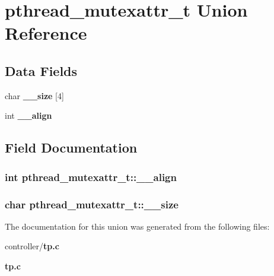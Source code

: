 \section{pthread\_\-mutexattr\_\-t Union Reference}
\label{unionpthread__mutexattr__t}
\subsection*{Data Fields}
\begin{DoxyCompactItemize}
\item 
char {\bf \_\-\_\-size} [4]
\item 
int {\bf \_\-\_\-align}
\end{DoxyCompactItemize}


\subsection{Field Documentation}
\subsubsection[{\_\-\_\-align}]{\setlength{\rightskip}{0pt plus 5cm}int {\bf pthread\_\-mutexattr\_\-t::\_\-\_\-align}}\label{unionpthread__mutexattr__t_acd638babf3a7cd2d4d576938de9fe8e8}
\subsubsection[{\_\-\_\-size}]{\setlength{\rightskip}{0pt plus 5cm}char {\bf pthread\_\-mutexattr\_\-t::\_\-\_\-size}}\label{unionpthread__mutexattr__t_a895680cb940172955d7c448ab6a12f19}


The documentation for this union was generated from the following files:\begin{DoxyCompactItemize}
\item 
controller/{\bf tp.c}\item 
{\bf tp.c}\end{DoxyCompactItemize}
